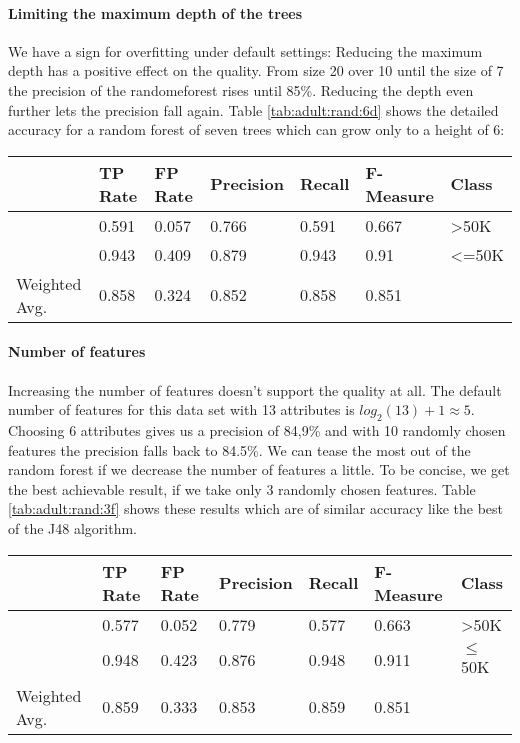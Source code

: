 \documentclass[paper=a4, fontsize=11pt]{scrartcl} %
\numberwithin{equation}{section} %
\numberwithin{figure}{section} %
\numberwithin{table}{section} %
\begin{document}
\paragraph{Limiting the maximum depth of the trees}
We have a sign for overfitting under default settings: Reducing the maximum depth has a positive effect on the quality. From size 20 over 10 until the size of 7 the precision of the randomeforest rises until 85\%. Reducing the depth even further lets the precision fall again. Table \ref{tab:adult:rand:6d} shows the detailed accuracy for a random forest of seven trees which can grow only to a height of 6:

\begin{table*}[htb]\centering
  \begin{tabular*}{\columnwidth}{@{}lllllll@{}}
      \toprule 
               &  TP Rate & FP Rate & Precision & Recall & F-Measure & Class \\ \midrule
               &  0.591   & 0.057   & 0.766     & 0.591  & 0.667     & >50K  \\
               &  0.943   & 0.409   & 0.879     & 0.943  & 0.91      & <=50K \\
Weighted Avg.  &  0.858   & 0.324   & 0.852     & 0.858  & 0.851     &       \\ \bottomrule
    \end{tabular*}
\caption{Random Forest -- 7 Random Trees each not more than 6 branches high} 
\label{tab:adult:rand:6d}
\end{table*}
\FloatBarrier

\paragraph{Number of features}
Increasing the number of features doesn't support the quality at all. The default number of features for this data set with 13 attributes is $ log_2(13) + 1 \approx 5 $. Choosing 6 attributes gives us a precision of 84,9\% and with 10 randomly chosen features the precision falls back to 84.5\%. We can tease the most out of the random forest if we decrease the number of features a little. To be concise, we get the best achievable result, if we take only 3 randomly chosen
features. Table \ref{tab:adult:rand:3f} shows these results which are of similar accuracy like the best of the J48 algorithm. 

\begin{table*}[htb]\centering
  \begin{tabular*}{\columnwidth}{@{}lllllll@{}}
      \toprule 
               &  TP Rate & FP Rate & Precision & Recall & F-Measure & Class \\   \midrule
               &  0.577   & 0.052   & 0.779     & 0.577  & 0.663     & >50K  \\   
               &  0.948   & 0.423   & 0.876     & 0.948  & 0.911     & $\leq$50K \\   
Weighted Avg.  &  0.859   & 0.333   & 0.853     & 0.859  & 0.851     &       \\   \bottomrule
    \end{tabular*}
\caption{Random Forest -- 3 Random Features} 
\label{tab:adult:rand:3f}
\end{table*}
\FloatBarrier
\end{document}
